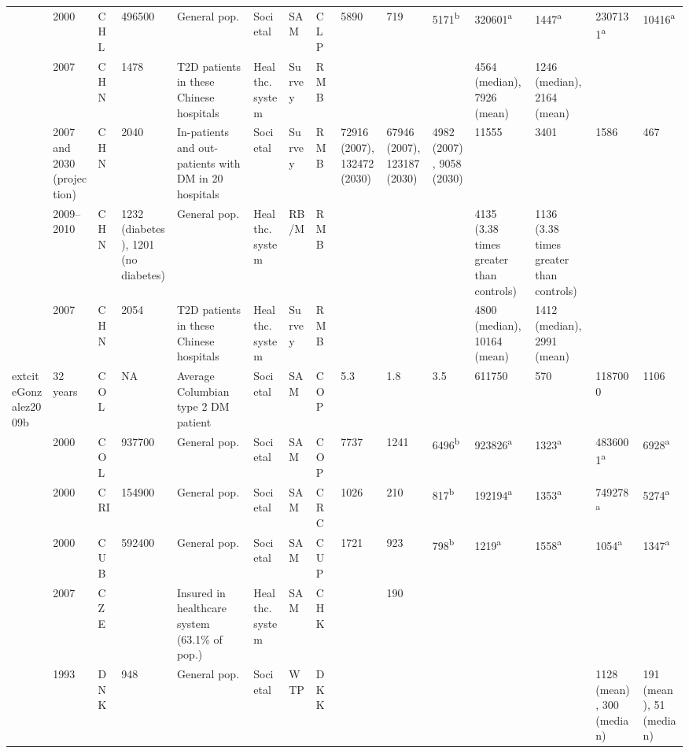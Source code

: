 {\begin{landscape}
\begin{tabularx}{\linewidth}{Z X X Z Z X X X X X X X X Y Y}
\textcite{Barcelo2003} & 2000 & CHL & 496500 & General pop. & Societal & SAM & CLP & 5890 & 719 & 5171\textsuperscript{b} & 320601\textsuperscript{a} & 1447\textsuperscript{a} & 2307131\textsuperscript{a} & 10416\textsuperscript{a} \\
\textcite{Wang2010c} & 2007 & CHN & 1478 & T2D patients in these Chinese hospitals & Healthc. system & Survey & RMB &  &  &  & 4564 (median), 7926 (mean) & 1246 (median), 2164 (mean) &  &  \\
\textcite{Wang2009f} & 2007 and 2030 (projection) & CHN & 2040 & In-patients and out-patients with DM in 20   hospitals & Societal & Survey & RMB & 72916 (2007), 132472 (2030) & 67946 (2007), 123187 (2030) & 4982 (2007), 9058 (2030) & 11555 & 3401 & 1586 & 467 \\
\textcite{Yang2012} & 2009--2010 & CHN & 1232 (diabetes), 1201 (no diabetes) & General pop. & Healthc. system & RB/M & RMB &  &  &  & 4135 (3.38 times greater than controls) & 1136 (3.38 times greater than controls) &  &  \\
\textcite{Wang2009b} & 2007 & CHN & 2054 & T2D patients in these Chinese hospitals & Healthc. system & Survey & RMB &  &  &  & 4800 (median), 10164 (mean) & 1412 (median), 2991 (mean) &  &  \\
	extcite{Gonzalez2009b} & 32 years & COL & NA & Average Columbian type 2 DM   patient & Societal & SAM & COP & 5.3 & 1.8 & 3.5 & 611750 & 570 & 1187000 & 1106 \\
\textcite{Barcelo2003} & 2000 & COL & 937700 & General pop. & Societal & SAM & COP & 7737 & 1241 & 6496\textsuperscript{b} & 923826\textsuperscript{a} & 1323\textsuperscript{a} & 4836001\textsuperscript{a} & 6928\textsuperscript{a} \\
\textcite{Barcelo2003} & 2000 & CRI & 154900 & General pop. & Societal & SAM & CRC & 1026 & 210 & 817\textsuperscript{b} & 192194\textsuperscript{a} & 1353\textsuperscript{a} & 749278\textsuperscript{a} & 5274\textsuperscript{a} \\
\textcite{Barcelo2003} & 2000 & CUB & 592400 & General pop. & Societal & SAM & CUP & 1721 & 923 & 798\textsuperscript{b} & 1219\textsuperscript{a} & 1558\textsuperscript{a} & 1054\textsuperscript{a} & 1347\textsuperscript{a} \\
\textcite{Horak2009} & 2007 & CZE &  & Insured in healthcare system (63.1\% of   pop.) & Healthc. system & SAM & CHK &  & 190 &  &  &  &  &  \\
\textcite{Gyldmark2001} & 1993 & DNK & 948 & General pop. & Societal & \ac{WTP} & DKK &  &  &  &  &  & 1128 (mean), 300 (median) & 191 (mean), 51 (median) \\

\end{tabularx}
\end{landscape}}
